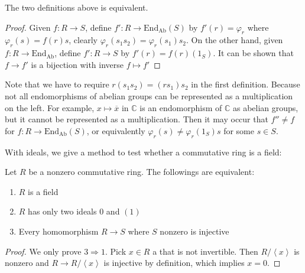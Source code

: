 \documentclass{note-eng}
\begin{document}
\begin{proposition}
The two definitions above is equivalent.
\end{proposition}

\begin{proof}
Given $f: R \rightarrow S$, define $f': R \rightarrow \mathrm{End}_{\mathrm{Ab}}(S)$ by $f'(r) = \varphi_r$ where $\varphi_r(s) = f(r)s$, clearly $\varphi_r(s_1s_2) = \varphi_r(s_1) s_2$. On the other hand, given $f: R \rightarrow \mathrm{End}_{\mathrm{Ab}}$, define $f': R \rightarrow S$ by $f'(r) = f(r)(1_S)$. It can be shown that $f \rightarrow f'$ is a bijection with inverse $f \mapsto f'$
\end{proof}

\begin{remark}
Note that we have to require $r(s_1s_2) = (rs_1)s_2$ in the first definition. Because not all endomorphisms of abelian groups can be represented as a multiplication on the left. For example, $x \mapsto \overline{x}$ in $\mathbb{C}$ is an endomorphism of $\mathbb{C}$ as abelian groups, but it cannot be represented as a multiplication. Then it may occur that $f'' \ne f$ for $f: R \rightarrow \mathrm{End}_{\mathrm{Ab}}(S)$, or equivalently $\varphi_r(s) \ne \varphi_r(1_S)s$ for some $s \in S$. 
\end{remark}

\fi

With ideals, we give a method to test whether a commutative ring is a field:

\begin{proposition}\label{prop:test-field-ideals}
    Let $R$ be a nonzero commutative ring. The followings are equivalent:
    \begin{enumerate}
        \item $R$ is a field
        \item $R$ has only two ideals $0$ and $(1)$
        \item Every homomorphism $R \rightarrow S$ where $S$ nonzero is injective
    \end{enumerate}
\end{proposition}

\begin{proof}
    We only prove $3 \Rightarrow 1$. Pick $x \in R$ a that is not invertible. Then $R / \left\langle x \right\rangle$ is nonzero and $R \rightarrow R / \left\langle x \right\rangle$ is injective by definition, which implies $x = 0$. 
\end{proof}
\end{document}

